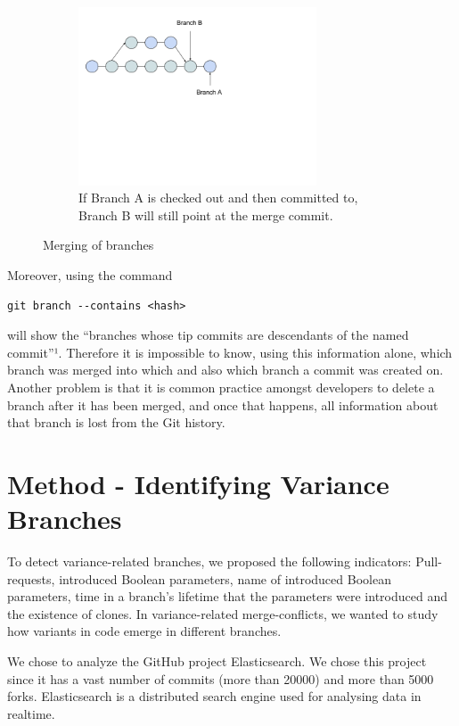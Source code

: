 \begin{figure}
~ %
\begin{subfigure}[b]{0.3\textwidth}
    \includegraphics[width=200pt]{figure/branch3.png}
    \caption{If Branch A is checked out and then committed to, Branch B will still point at the merge commit.}
    \label{fig:mbranch3}
\end{subfigure}
\caption{Merging of branches}\label{fig:branches}
\end{figure}

Moreover, using the command
\lstset{language=Bash,numbers=left,xleftmargin=2em,frame=single,framexleftmargin=1.5em}
\begin{lstlisting}[frame=single,breaklines=true,tabsize=2]
git branch --contains <hash>
\end{lstlisting}
will show the “branches whose tip commits are descendants of the named commit”¹. Therefore it is impossible to know, using this information alone, which branch was merged into which and also which branch a commit was created on. Another problem is that it is common practice amongst developers to delete a branch after it has been merged, and once that happens, all information about that branch is lost from the Git history.

\section{Method - Identifying Variance Branches}
To detect variance-related branches, we proposed the following indicators: Pull-requests, introduced Boolean parameters, name of introduced Boolean parameters, time in a branch’s lifetime that the parameters were introduced and the existence of clones. In variance-related merge-conflicts, we wanted to study how variants in code emerge in different branches. 

We chose to analyze the GitHub project Elasticsearch. We chose this project since it has a vast number of commits (more than 20000) and more than 5000 forks. Elasticsearch is a distributed search engine used for analysing data in realtime.  %


